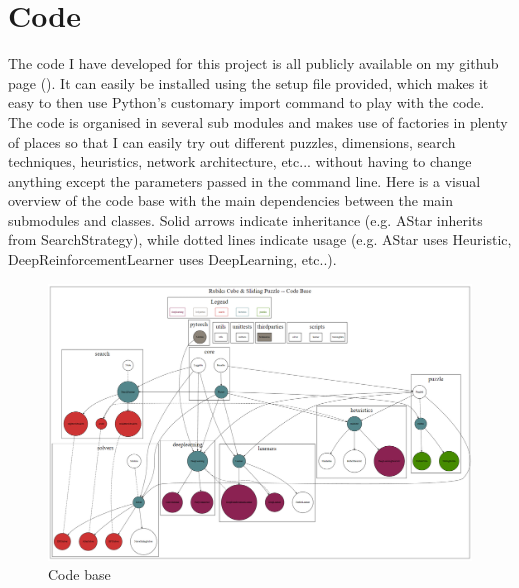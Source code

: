 
\chapter{Code} %

\label{Chapter3} %



The code I have developed for this project is all publicly available on my github page (\cite{FB}). It can easily be installed using the setup file provided, which makes it easy to then use Python's customary import command to play with the code.
The code is organised in several sub modules and makes use of factories in plenty of places so that I can easily try out different puzzles, dimensions, search techniques, heuristics, network architecture, etc... without having to change anything except the parameters passed in the command line. Here is a visual overview of the code base with the main dependencies between the main submodules and classes. Solid arrows indicate inheritance (e.g. AStar inherits from SearchStrategy), while dotted lines indicate usage (e.g. AStar uses Heuristic, DeepReinforcementLearner uses DeepLearning, etc..).

\begin{landscape}
\begin{figure}[H]
\centering
\includegraphics[scale=0.49]{./Figures/codebase}
\caption[Codebase]{Code base}
\label{fig:Codebase}
\end{figure}
\end{landscape}


